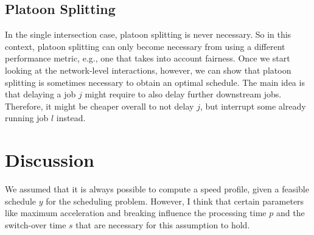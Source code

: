 \documentclass{article}
\theoremstyle{definition}
\theoremstyle{plain}
\begin{document}
\subsection{Platoon Splitting}

In the single intersection case, platoon splitting is never necessary. So in
this context, platoon splitting can only become necessary from using a different
performance metric, e.g., one that takes into account fairness. Once we start
looking at the network-level interactions, however, we can show that platoon
splitting is sometimes necessary to obtain an optimal schedule. The main idea is
that delaying a job $j$ might require to also delay further downstream jobs.
Therefore, it might be cheaper overall to not delay $j$, but interrupt some
already running job $l$ instead.


\section{Discussion}

We assumed that it is always possible to compute a speed profile, given a
feasible schedule $y$ for the scheduling problem. However, I think that certain
parameters like maximum acceleration and breaking influence the processing time
$p$ and the switch-over time $s$ that are necessary for this assumption to hold.




\end{document}
